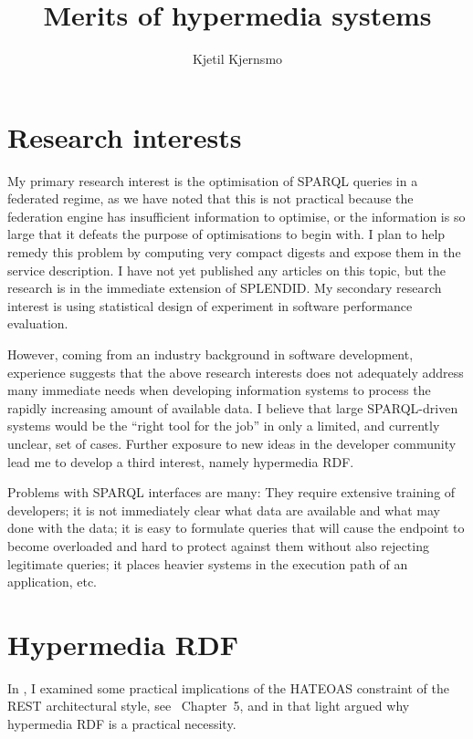 \documentclass{article}
\title{Merits of hypermedia systems}
\author{Kjetil Kjernsmo}
\begin{document}
\maketitle

\section{Research interests}

My primary research interest is the optimisation of SPARQL queries in
a federated regime, as we have noted that this is not practical
because the federation engine has insufficient information to
optimise, or the information is so large that it defeats the purpose
of optimisations to begin with. I plan to help remedy this problem by
computing very compact digests and expose them in the service
description. I have not yet published any articles on this topic, but
the research is in the immediate extension of
SPLENDID\cite{splendid}. My secondary research interest is using statistical design of
experiment in software performance evaluation.

However, coming from an industry background in software development,
experience suggests that the above research interests does not
adequately address many immediate needs when developing information
systems to process the rapidly increasing amount of available data. I
believe that large SPARQL-driven systems would be the ``right tool for
the job'' in only a limited, and currently unclear, set of
cases. Further exposure to new ideas in the developer community lead
me to develop a third interest, namely hypermedia RDF. 

Problems with SPARQL interfaces are many: They require extensive
training of developers; it is not immediately clear what data are
available and what may done with the data; it is easy to formulate
queries that will cause the endpoint to become overloaded and hard to
protect against them without also rejecting legitimate queries; it
places heavier systems in the execution path of an application, etc.

\section{Hypermedia RDF}

In \cite{kjernsmo_lapis_2012}, I examined some practical implications of
the HATEOAS constraint of the REST architectural style, see
\cite{Fielding_2000_Architectural-Styles}~Chapter~5, and in that
light argued why hypermedia RDF is a practical necessity.
\end{document}
